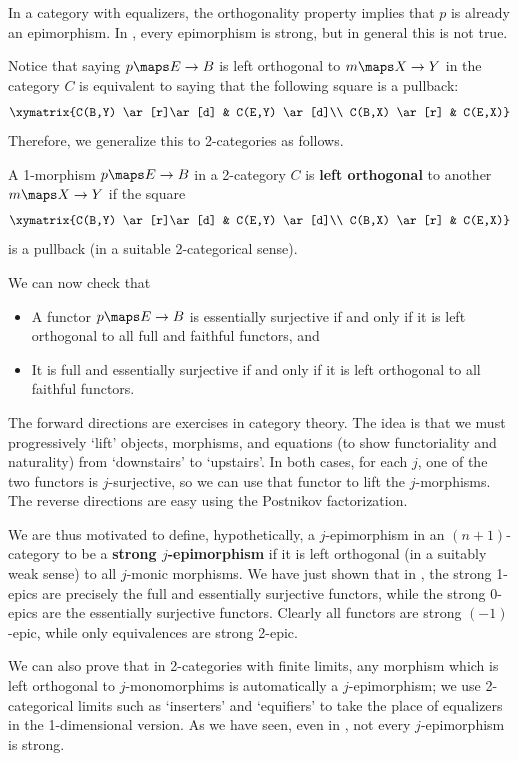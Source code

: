\documentclass[12pt]{amsart}
\begin{document}
In a category with equalizers, the orthogonality property implies that
$p$ is already an epimorphism.  In \Set, every epimorphism is strong,
but in general this is not true.

Notice that saying $p\maps E\to B$ is left orthogonal to $m\maps X\to
Y$ in the category $C$ is equivalent to saying that the following
square is a pullback:
\[\xymatrix{C(B,Y) \ar[r]\ar[d] & C(E,Y) \ar[d]\\
  C(B,X) \ar[r] & C(E,X)}\]
Therefore, we generalize this to 2-categories as follows.

\begin{defn}
  A 1-morphism $p\maps E\to B$ in a 2-category $C$ is \textbf{left
    orthogonal} to another $m\maps X\to Y$ if the square
  \[\xymatrix{C(B,Y) \ar[r]\ar[d] & C(E,Y) \ar[d]\\
    C(B,X) \ar[r] & C(E,X)}\]
  is a pullback (in a suitable 2-categorical sense).
\end{defn}

We can now check that
\begin{itemize}
\item A functor $p\maps E\to B$ is essentially surjective if and only
  if it is left orthogonal to all full and faithful functors, and
\item It is full and essentially surjective if and only if it is left
  orthogonal to all faithful functors.
\end{itemize}

The forward directions are exercises in category theory.  The idea is
that we must progressively `lift' objects, morphisms, and equations
(to show functoriality and naturality) from `downstairs' to
`upstairs'.  In both cases, for each $j$, one of the two functors is
$j$-surjective, so we can use that functor to lift the $j$-morphisms.
The reverse directions are easy using the Postnikov factorization.

We are thus motivated to define, hypothetically, a $j$-epimorphism in
an $(n+1)$-category to be a \textbf{strong $j$-epimorphism} if it is
left orthogonal (in a suitably weak sense) to all $j$-monic morphisms.
We have just shown that in \Cat, the strong 1-epics are precisely the
full and essentially surjective functors, while the strong 0-epics are
the essentially surjective functors.  Clearly all functors are strong
$(-1)$-epic, while only equivalences are strong 2-epic.

We can also prove that in 2-categories with finite limits, any
morphism which is left orthogonal to $j$-monomorphims is automatically
a $j$-epimorphism; we use 2-categorical limits such as `inserters' and
`equifiers' to take the place of equalizers in the 1-dimensional
version.  As we have seen, even in \Cat, not every $j$-epimorphism is
strong.
\end{document}
